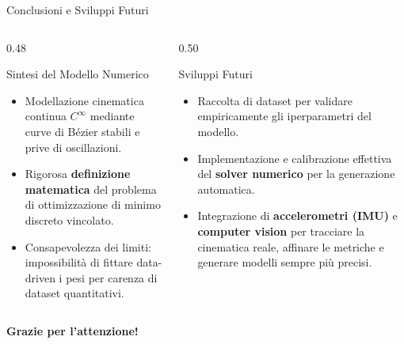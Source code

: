 \documentclass[aspectratio=169, 10pt]{beamer}
\begin{document}
\begin{frame}{Conclusioni e Sviluppi Futuri}
    \begin{columns}[T]
        \begin{column}{0.48\textwidth}
            \begin{block}{Sintesi del Modello Numerico}
                \footnotesize
                \begin{itemize}
                    \item Modellazione cinematica continua $C^\infty$ mediante curve di Bézier stabili e prive di oscillazioni.
                    \item Rigorosa \textbf{definizione matematica} del problema di ottimizzazione di minimo discreto vincolato.
                    \item Consapevolezza dei limiti: impossibilità di fittare data-driven i pesi per carenza di dataset quantitativi.
                \end{itemize}
            \end{block}
        \end{column}
        \begin{column}{0.50\textwidth}
            \begin{block}{Sviluppi Futuri}
                \footnotesize
                \begin{itemize}
                    \item Raccolta di dataset per validare empiricamente gli iperparametri del modello.
                    \item Implementazione e calibrazione effettiva del \textbf{solver numerico} per la generazione automatica.
                    \item Integrazione di \textbf{accelerometri (IMU)} e \textbf{computer vision} per tracciare la cinematica reale, affinare le metriche e generare modelli sempre più precisi.
                \end{itemize}
            \end{block}
        \end{column}
    \end{columns}
    \vspace{0.4cm}
    \begin{center}
        \Large \textbf{Grazie per l'attenzione!}
    \end{center}
\end{frame}
\end{document}
